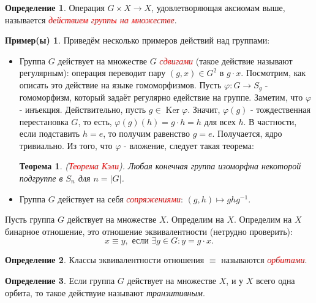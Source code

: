 \documentclass[a4paper,100pt]{article}
\theoremstyle{indented}
\newtheorem{theorem}{Теорема}
\theoremstyle{definition}
\newtheorem{defn}{Определение}
\newtheorem{exl}{Пример(ы)}
\theoremstyle{remark}
\DeclareMathOperator{\Ker}{Ker}
\begin{document}
\begin{defn}
    Операция $G\times X\rightarrow X$, удовлетворяющая аксиомам выше, называется \hypertarget{n78}{\textcolor{red}{\textit{действием группы на множестве}}}.
\end{defn}

\begin{exl}
    Приведём несколько примеров действий над группами:\ 

    \begin{itemize}
        \item Группа $G$ действует на множестве $G$ \hypertarget{n79}{\textcolor{red}{\textit{сдвигами}}} (такое действие называют регулярным): операция переводит пару $(g, x)\in G^2$ в $g\cdot x$. Посмотрим, как описать это действие на языке гомоморфизмов. Пусть $\varphi: G \rightarrow S_g$ - гомоморфизм, который задаёт регулярно едействие на группе. Заметим, что $\varphi$ - инъекция. Действительно, пусть $g\in \Ker \varphi$. Значит, $\varphi(g)$ - тождественная перестановка $G$, то есть, $\varphi(g)(h)=g\cdot h = h$ для всех $h$. В частности, если подставить $h=e$, то получим равенство $g=e$. Получается, ядро тривиально. Из того, что $\varphi$ - вложение, следует такая теорема:\\
        
        \begin{theorem}
            (\hypertarget{n80}{\textcolor{red}{\textit{Теорема Кэли}}}). Любая конечная группа изоморфна некоторой подгруппе в $S_n$ для $n=\vert G\vert$.
        \end{theorem}

        \item Группа $G$ действует на себя \hypertarget{n81}{\textcolor{red}{\textit{сопряжениями}}}: $(g, h)\mapsto ghg^{-1}$.

    \end{itemize}
\end{exl}

Пусть группа $G$ действует на множестве $X$. Определим на $X$. Определим на $X$ бинарное отношение, это отношение эквивалентности (нетрудно проверить): 
\[
    x\equiv y, \text{ если }\exists g\in G:y=g\cdot x.
\]

\begin{defn}
    Классы эквивалентности отношения $\equiv$ называются \hypertarget{n82}{\textcolor{red}{\textit{орбитами}}}.
\end{defn}

\begin{defn}
    Если группа $G$ действует на множестве $X$, и у $X$ всего одна орбита, то такое действуие называют \textit{транзитивным}.
\end{defn}
\end{document}
